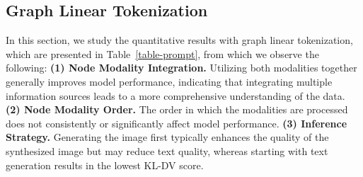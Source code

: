 \subsection{Graph Linear Tokenization}
\label{sec:res-linear}
In this section, we study the quantitative results with graph linear tokenization, which are presented in Table~\ref{table-prompt}, from which we observe the following:
\newline \noindent \textbf{(1) Node Modality Integration.} Utilizing both modalities together generally improves model performance, indicating that integrating multiple information sources leads to a more comprehensive understanding of the data.
\newline \noindent \textbf{(2) Node Modality Order.} The order in which the modalities are processed does not consistently or significantly affect model performance.
\newline \noindent \textbf{(3) Inference Strategy.} Generating the image first typically enhances the quality of the synthesized image but may reduce text quality, whereas starting with text generation results in the lowest KL-DV score.


